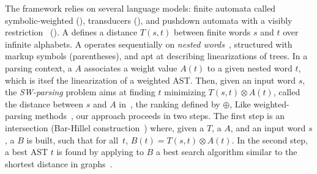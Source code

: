 The framework relies on several language models:
finite automata called symbolic-weighted (\SWA),
transducers (\SWT), and pushdown automata
with a visibly restriction~\cite{AlurMadhusudan09nested} (\SWVPA).
A \SWT defines a distance $T(s, t)$ between finite words $s$ and $t$
over infinite alphabets. %
A  \SWVPA operates sequentially on \emph{nested words}~\cite{AlurMadhusudan09nested},
structured with markup symbols (parentheses), and apt at describing linearizations of trees.
In a parsing context, a \SWVPA $A$ associates a weight value $A(t)$ %
to a given nested word $t$, which is itsef the linearization of a weighted AST. %
%
Then, given an input word $s$, the \emph{SW-parsing} problem aims at
finding $t$ minimizing
$T(s, t) \otimes A(t)$, called the distance between $s$ and $A$ in~\cite{Mohri03EDWA},
\wrt the ranking defined by $\oplus$,
Like weighted-parsing
methods~\cite{Goodman99SemiringParsing,Nederhof03weightedParsing,MorbitzVogler19weighted-parsing},
our approach proceeds in two steps.
The first step is an intersection
(Bar-Hillel construction~\cite{GruneJacobs08parsing})
where, given a \SWT $T$, a \SWVPA $A$, and an input word $s$,
a \SWVPA $B$ %
is built, such that for all~$t$,
$B(t) = T(s, t) \otimes A(t)$.%
In the second step, a best AST $t$ is found by applying to $B$ %
a best search algorithm similar to the shortest distance
in graphs~\cite{Mohri02semiring,Huang05kbest}.
%

